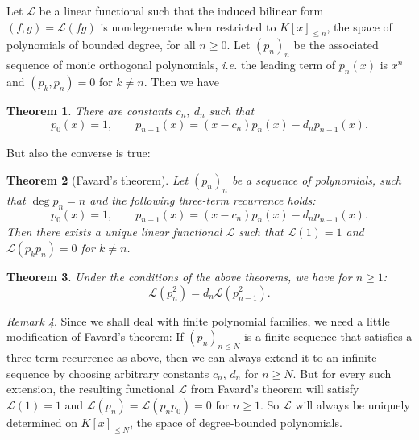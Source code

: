 \documentclass{amsart}
\newcommand{\ie}{{\it i.e. }}
\renewcommand{\L}{\mathcal{L}}
\theoremstyle{plain}
\newtheorem{theorem}{Theorem}[section]
\theoremstyle{definition}
\theoremstyle{remark}
\newtheorem{remark}[theorem]{Remark}
\begin{document}
Let $\L$ be a linear functional such that the induced bilinear form $(f,g)=\L(fg)$ is nondegenerate when restricted to $K[x]_{\leq n}$, the space of polynomials of bounded degree, for all $n\geq 0$. Let $(p_n)_n$ be the associated sequence of monic orthogonal polynomials, \ie the leading term of $p_n(x)$ is $x^n$ and $(p_k,p_{n})=0$ for $k\neq n$. Then we have
\begin{theorem} \cite[Thm.~4.1]{Chihara} There are constants $c_n,\: d_n$ such that
\begin{equation*}
 p_0(x) = 1,\qquad  p_{n+1}(x) = (x-c_n)p_n(x) - d_np_{n-1}(x).
\end{equation*}
\end{theorem}
But also the converse is true:
\begin{theorem}[Favard's theorem] \cite[Thm.~4.4]{Chihara} \label{favard}
Let $(p_n)_n$ be a sequence of polynomials, such that $\deg p_n =n$ and the following three-term recurrence holds:
$$p_0(x) = 1,\qquad  p_{n+1}(x) = (x-c_n)p_n(x) - d_np_{n-1}(x).
$$
Then there exists a unique linear functional $\L$ such that $\L(1)=1$ and $\L(p_kp_{n})=0$ for $k\neq n$. 
\end{theorem}
\begin{theorem}\cite[Thm.~4.2]{Chihara} \label{generalLnorm}
Under the conditions of the above theorems, we have for $n\geq 1$: $$\L(p_n^2) = d_n\L(p_{n-1}^2).$$
\end{theorem}
\begin{remark} \label{finiteFarvard}Since we shall deal with finite polynomial families, we need a little modification of Favard's theorem:
If $(p_n)_{n\leq N}$ is a finite sequence that satisfies a three-term recurrence as above, then we can always extend it to an infinite sequence by choosing arbitrary constants $c_n$, $d_n$ for $n\geq N$. But for every such extension, the resulting functional $\L$ from Favard's theorem will satisfy $\L(1) =1$ and $\L(p_n)=\L(p_np_0)=0$ for $n\geq 1$. So $\L$ will always be uniquely determined on $K[x]_{\leq N}$, the space of degree-bounded polynomials.
\end{remark}
\end{document}
